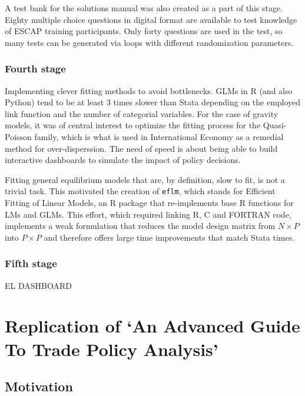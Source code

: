 \documentclass[12pt,reqno,oneside,pdftex]{formato-puc/puctesis} %
\begin{document}
A test bank for the solutions manual was also created as a part of this
stage. Eighty multiple choice questions in digital format are available
to test knowledge of ESCAP training participants. Only forty questions
are used in the test, so many tests can be generated via loops with
different randomization parameters.

\hypertarget{fourth-stage}{%
\subsection{Fourth stage}\label{fourth-stage}}

Implementing clever fitting methods to avoid bottlenecks. GLMs in R (and
also Python) tend to be at least 3 times slower than Stata depending on
the employed link function and the number of categorial variables. For
the case of gravity models, it was of central interest to optimize the
fitting process for the Quasi-Poisson family, which is what is used in
International Economy as a remedial method for over-disperssion. The
need of speed is about being able to build interactive dashboards to
simulate the impact of policy decisions.

Fitting general equilibrium models that are, by definition, slow to fit,
is not a trivial task. This motivated the creation of \texttt{eflm},
which stands for Efficient Fitting of Linear Models, an R package that
re-implements base R functions for LMs and GLMs. This effort, which
required linking R, C and FORTRAN code, implements a weak formulation
that reduces the model design matrix from \(N\times P\) into
\(P\times P\) and therefore offers large time improvements that match
Stata times.

\hypertarget{fifth-stage}{%
\subsection{Fifth stage}\label{fifth-stage}}

EL DASHBOARD

\chapter{Replication of `An Advanced Guide To Trade Policy Analysis'}

\hypertarget{motivation}{%
\section{Motivation}\label{motivation}}
\end{document}
